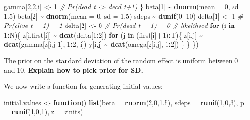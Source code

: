 \documentclass[
  12pt,
]{krantz}
\newenvironment{Shaded}{\begin{snugshade}}{\end{snugshade}}
\newcommand{\AttributeTok}[1]{\textcolor[rgb]{0.13,0.29,0.53}{#1}}
\newcommand{\CommentTok}[1]{\textcolor[rgb]{0.56,0.35,0.01}{\textit{#1}}}
\newcommand{\ControlFlowTok}[1]{\textcolor[rgb]{0.13,0.29,0.53}{\textbf{#1}}}
\newcommand{\DecValTok}[1]{\textcolor[rgb]{0.00,0.00,0.81}{#1}}
\newcommand{\FloatTok}[1]{\textcolor[rgb]{0.00,0.00,0.81}{#1}}
\newcommand{\FunctionTok}[1]{\textcolor[rgb]{0.13,0.29,0.53}{\textbf{#1}}}
\newcommand{\NormalTok}[1]{#1}
\newcommand{\OtherTok}[1]{\textcolor[rgb]{0.56,0.35,0.01}{#1}}
\newcommand{\SpecialCharTok}[1]{\textcolor[rgb]{0.81,0.36,0.00}{\textbf{#1}}}
\begin{document}
\begin{Shaded}
\begin{Highlighting}[]
\NormalTok{    gamma[}\DecValTok{2}\NormalTok{,}\DecValTok{2}\NormalTok{,i] }\OtherTok{\textless{}{-}} \DecValTok{1}           \CommentTok{\# Pr(dead t {-}\textgreater{} dead t+1)}
\NormalTok{  \}}
\NormalTok{  beta[}\DecValTok{1}\NormalTok{] }\SpecialCharTok{\textasciitilde{}} \FunctionTok{dnorm}\NormalTok{(}\AttributeTok{mean =} \DecValTok{0}\NormalTok{, }\AttributeTok{sd =} \FloatTok{1.5}\NormalTok{)}
\NormalTok{  beta[}\DecValTok{2}\NormalTok{] }\SpecialCharTok{\textasciitilde{}} \FunctionTok{dnorm}\NormalTok{(}\AttributeTok{mean =} \DecValTok{0}\NormalTok{, }\AttributeTok{sd =} \FloatTok{1.5}\NormalTok{)}
\NormalTok{  sdeps }\SpecialCharTok{\textasciitilde{}} \FunctionTok{dunif}\NormalTok{(}\DecValTok{0}\NormalTok{, }\DecValTok{10}\NormalTok{)}
\NormalTok{  delta[}\DecValTok{1}\NormalTok{] }\OtherTok{\textless{}{-}} \DecValTok{1}          \CommentTok{\# Pr(alive t = 1) = 1}
\NormalTok{  delta[}\DecValTok{2}\NormalTok{] }\OtherTok{\textless{}{-}} \DecValTok{0}          \CommentTok{\# Pr(dead t = 1) = 0}
  \CommentTok{\# likelihood}
  \ControlFlowTok{for}\NormalTok{ (i }\ControlFlowTok{in} \DecValTok{1}\SpecialCharTok{:}\NormalTok{N)\{}
\NormalTok{    z[i,first[i]] }\SpecialCharTok{\textasciitilde{}} \FunctionTok{dcat}\NormalTok{(delta[}\DecValTok{1}\SpecialCharTok{:}\DecValTok{2}\NormalTok{])}
    \ControlFlowTok{for}\NormalTok{ (j }\ControlFlowTok{in}\NormalTok{ (first[i]}\SpecialCharTok{+}\DecValTok{1}\NormalTok{)}\SpecialCharTok{:}\NormalTok{T)\{}
\NormalTok{      z[i,j] }\SpecialCharTok{\textasciitilde{}} \FunctionTok{dcat}\NormalTok{(gamma[z[i,j}\DecValTok{{-}1}\NormalTok{], }\DecValTok{1}\SpecialCharTok{:}\DecValTok{2}\NormalTok{, i])}
\NormalTok{      y[i,j] }\SpecialCharTok{\textasciitilde{}} \FunctionTok{dcat}\NormalTok{(omega[z[i,j], }\DecValTok{1}\SpecialCharTok{:}\DecValTok{2}\NormalTok{])}
\NormalTok{    \}}
\NormalTok{  \}}
\NormalTok{\})}
\end{Highlighting}
\end{Shaded}

The prior on the standard deviation of the random effect is uniform between 0 and 10. \textbf{Explain how to pick prior for SD.}

We now write a function for generating initial values:

\begin{Shaded}
\begin{Highlighting}[]
\NormalTok{initial.values }\OtherTok{\textless{}{-}} \ControlFlowTok{function}\NormalTok{() }\FunctionTok{list}\NormalTok{(}\AttributeTok{beta =} \FunctionTok{rnorm}\NormalTok{(}\DecValTok{2}\NormalTok{,}\DecValTok{0}\NormalTok{,}\FloatTok{1.5}\NormalTok{),}
                                  \AttributeTok{sdeps =} \FunctionTok{runif}\NormalTok{(}\DecValTok{1}\NormalTok{,}\DecValTok{0}\NormalTok{,}\DecValTok{3}\NormalTok{),}
                                  \AttributeTok{p =} \FunctionTok{runif}\NormalTok{(}\DecValTok{1}\NormalTok{,}\DecValTok{0}\NormalTok{,}\DecValTok{1}\NormalTok{),}
                                  \AttributeTok{z =}\NormalTok{ zinits)}
\end{Highlighting}
\end{Shaded}
\end{document}
